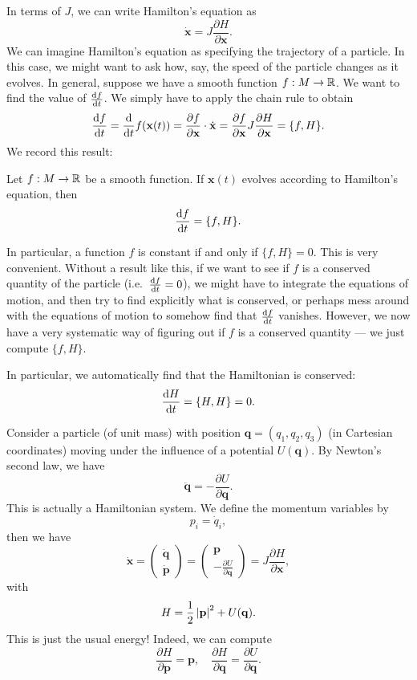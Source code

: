 \documentclass[a4paper]{article}
\begin{document}
In terms of $J$, we can write Hamilton's equation as
\[
  \dot{\mathbf{x}} = J \frac{\partial H}{\partial \mathbf{x}}.
\]
We can imagine Hamilton's equation as specifying the trajectory of a particle. In this case, we might want to ask how, say, the speed of the particle changes as it evolves. In general, suppose we have a smooth function $f: M \to \mathbb{R}$. We want to find the value of $\frac{\mathrm{d} f}{\mathrm{d} t}$. We simply have to apply the chain rule to obtain
\[
  \frac{\mathrm{d} f}{\mathrm{d} t} = \frac{\mathrm{d}}{\mathrm{d} t} f(\mathbf{x}(t)) = \frac{\partial f}{\partial \mathbf{x}} \cdot \dot{\mathbf{x}} = \frac{\partial f}{\partial \mathbf{x}} J \frac{\partial H}{\partial \mathbf{x}} = \{f, H\}.
\]
We record this result:
\begin{prop}
  Let $f: M \to \mathbb{R}$ be a smooth function. If $\mathbf{x}(t)$ evolves according to Hamilton's equation, then
  \[
    \frac{\mathrm{d} f}{\mathrm{d} t} = \{f, H\}.
  \]
\end{prop}
In particular, a function $f$ is constant if and only if $\{f, H\} = 0$. This is very convenient. Without a result like this, if we want to see if $f$ is a conserved quantity of the particle (i.e.\ $\frac{\mathrm{d} f}{\mathrm{d} t} = 0$), we might have to integrate the equations of motion, and then try to find explicitly what is conserved, or perhaps mess around with the equations of motion to somehow find that $\frac{\mathrm{d} f}{\mathrm{d} t}$ vanishes. However, we now have a very systematic way of figuring out if $f$ is a conserved quantity --- we just compute $\{f, H\}$.

In particular, we automatically find that the Hamiltonian is conserved:
\[
  \frac{\mathrm{d} H}{\mathrm{d} t} = \{H, H\} = 0.
\]
\begin{eg}
  Consider a particle (of unit mass) with position $\mathbf{q} = (q_1, q_2, q_3)$ (in Cartesian coordinates) moving under the influence of a potential $U(\mathbf{q})$. By Newton's second law, we have
  \[
    \ddot{\mathbf{q}} = -\frac{\partial U}{\partial \mathbf{q}}.
  \]
  This is actually a Hamiltonian system. We define the momentum variables by
  \[
    p_i = \dot{q}_i,
  \]
  then we have
  \[
    \dot{\mathbf{x}} =
    \begin{pmatrix}
      \dot{\mathbf{q}}\\
      \dot{\mathbf{p}}
    \end{pmatrix}
    =
    \begin{pmatrix}
      \mathbf{p}\\
      -\frac{\partial U}{\partial \mathbf{q}}
    \end{pmatrix}
    = J \frac{\partial H}{\partial \mathbf{x}},
  \]
  with
  \[
    H = \frac{1}{2} \left\lvert \mathbf{p}\right\rvert^2 + U(\mathbf{q}).
  \]
  This is just the usual energy! Indeed, we can compute
  \[
    \frac{\partial H}{\partial \mathbf{p}} = \mathbf{p},\quad \frac{\partial H}{\partial \mathbf{q}} = \frac{\partial U}{\partial \mathbf{q}}.
  \]
\end{eg}
\end{document}
